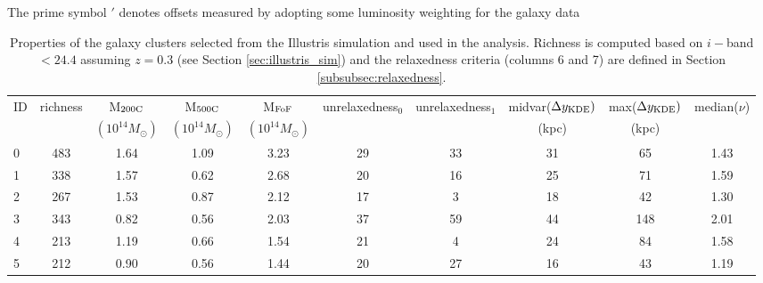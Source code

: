 \documentclass[usenatbib]{mn2e}
\begin{document}
{\begin{table}
\begin{center}
\end{center}
\footnotesize{The prime symbol  $'$ denotes offsets measured by adopting some luminosity weighting for the galaxy 
data}
\end{table}


\begin{table*}
	\begin{center}
	\caption{Properties of the galaxy clusters selected from the Illustris simulation and used in the analysis. Richness is
	computed based on $i-$band $< 24.4$ assuming $z=0.3$ (see Section \ref{sec:illustris_sim}) and the relaxedness criteria (columns 6 and 7) are defined in Section \ref{subsubsec:relaxedness}.\label{tab:cluster_prop} }
	\begin{tabular}{lccccccccc}
\toprule
ID & richness & M$_{\rm 200C}$ & M$_{\rm 500C} $ & M$_{\rm FoF}$  & unrelaxedness$_0$ & unrelaxedness$_1$ & midvar($\Delta y_{\rm KDE})$ & max($\Delta y_{\rm KDE})$& median($\nu$) \\
& & $(10^{14} M_\odot)$ & $(10^{14}M_\odot)$ & $(10^{14} M_\odot)$  &  & & (kpc) & (kpc) & \\
\midrule
 0 &      483 &                             1.64 &                             1.09 &                             3.23 &              29 &              33 &                                 31 &                              65 &       1.43 \\
 1 &      338 &                             1.57 &                             0.62 &                             2.68 &              20 &              16 &                                 25 &                              71 &       1.59 \\
 2 &      267 &                             1.53 &                             0.87 &                             2.12 &              17 &               3 &                                 18 &                              42 &       1.30 \\
 3 &      343 &                             0.82 &                             0.56 &                             2.03 &              37 &              59 &                                 44 &                             148 &       2.01 \\
 4 &      213 &                             1.19 &                             0.66 &                             1.54 &              21 &               4 &                                 24 &                              84 &       1.58 \\
 5 &      212 &                             0.90 &                             0.56 &                             1.44 &              20 &              27 &                                 16 &                              43 &       1.19 \\

\end{tabular}
\end{center}
\end{table*}}
\end{document}
